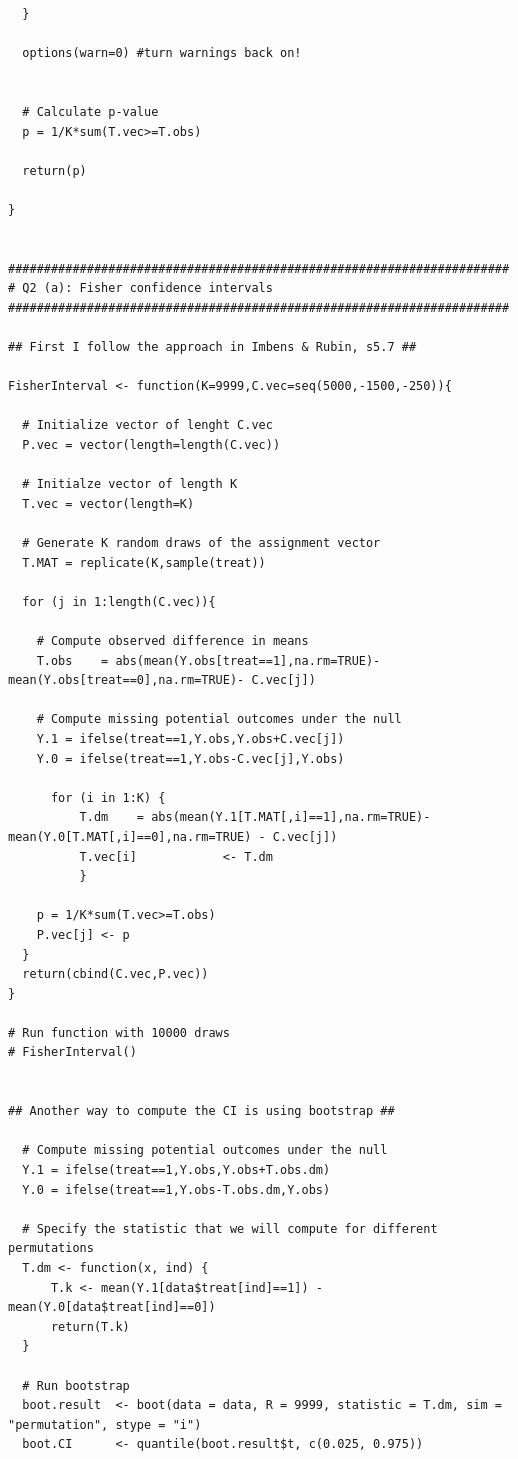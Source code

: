 \documentclass[12pt]{article}
\begin{document}
\begin{verbatim}
  }
  
  options(warn=0) #turn warnings back on!
  
  
  # Calculate p-value
  p = 1/K*sum(T.vec>=T.obs)
  
  return(p)
  
}


######################################################################
# Q2 (a): Fisher confidence intervals
######################################################################

## First I follow the approach in Imbens & Rubin, s5.7 ##

FisherInterval <- function(K=9999,C.vec=seq(5000,-1500,-250)){

  # Initialize vector of lenght C.vec
  P.vec = vector(length=length(C.vec))

  # Initialze vector of length K
  T.vec = vector(length=K)

  # Generate K random draws of the assignment vector
  T.MAT = replicate(K,sample(treat))
  
  for (j in 1:length(C.vec)){
    
    # Compute observed difference in means
    T.obs    = abs(mean(Y.obs[treat==1],na.rm=TRUE)-mean(Y.obs[treat==0],na.rm=TRUE)- C.vec[j])
    
    # Compute missing potential outcomes under the null
    Y.1 = ifelse(treat==1,Y.obs,Y.obs+C.vec[j])
    Y.0 = ifelse(treat==1,Y.obs-C.vec[j],Y.obs)

      for (i in 1:K) {
          T.dm    = abs(mean(Y.1[T.MAT[,i]==1],na.rm=TRUE)-mean(Y.0[T.MAT[,i]==0],na.rm=TRUE) - C.vec[j])
          T.vec[i]            <- T.dm
          }
  
    p = 1/K*sum(T.vec>=T.obs)
    P.vec[j] <- p
  }
  return(cbind(C.vec,P.vec))
}

# Run function with 10000 draws
# FisherInterval()


## Another way to compute the CI is using bootstrap ##

  # Compute missing potential outcomes under the null
  Y.1 = ifelse(treat==1,Y.obs,Y.obs+T.obs.dm)
  Y.0 = ifelse(treat==1,Y.obs-T.obs.dm,Y.obs)

  # Specify the statistic that we will compute for different permutations
  T.dm <- function(x, ind) {
      T.k <- mean(Y.1[data$treat[ind]==1]) - mean(Y.0[data$treat[ind]==0])
      return(T.k)
  }
  
  # Run bootstrap
  boot.result  <- boot(data = data, R = 9999, statistic = T.dm, sim = "permutation", stype = "i")
  boot.CI      <- quantile(boot.result$t, c(0.025, 0.975))
  

\end{verbatim}
\end{document}
